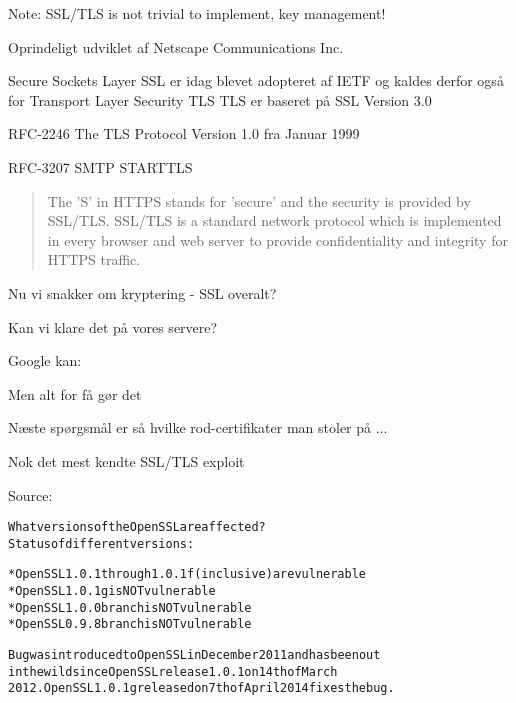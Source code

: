 \documentclass[20pt,landscape,a4paper,footrule]{foils}
\begin{document}
\centerline{Note: SSL/TLS is not trivial to implement, key management!}



\begin{list1}
\item Oprindeligt udviklet af Netscape Communications Inc.
\item Secure Sockets Layer SSL er idag blevet adopteret af IETF og kaldes
derfor også for Transport Layer Security TLS
TLS er baseret på SSL Version 3.0
\item RFC-2246 The TLS Protocol Version 1.0 fra Januar 1999
\item RFC-3207 SMTP STARTTLS
\end{list1}



\begin{quote}
The 'S' in HTTPS stands for 'secure' and the security is provided by SSL/TLS. SSL/TLS is a standard network protocol which is implemented in every browser and web server to provide confidentiality and integrity for HTTPS traffic.
\end{quote}

\begin{list1}
\item Nu vi snakker om kryptering - SSL overalt?
\item Kan vi klare det på vores servere?
\pause
\item Google kan:\\
\item Men alt for få gør det
\end{list1}
\pause
\centerline{Næste spørgsmål er så hvilke rod-certifikater man stoler på ...}





\centerline{Nok det mest kendte SSL/TLS exploit}

Source: 




\begin{alltt}
What versions of the OpenSSL are affected?
Status of different versions:

* OpenSSL 1.0.1 through 1.0.1f (inclusive) are vulnerable
* OpenSSL 1.0.1g is NOT vulnerable
* OpenSSL 1.0.0 branch is NOT vulnerable
* OpenSSL 0.9.8 branch is NOT vulnerable

Bug was introduced to OpenSSL in December 2011 and has been out
in the wild since OpenSSL release 1.0.1 on 14th of March
2012. OpenSSL 1.0.1g released on 7th of April 2014 fixes the bug.
\end{alltt}
\end{document}
